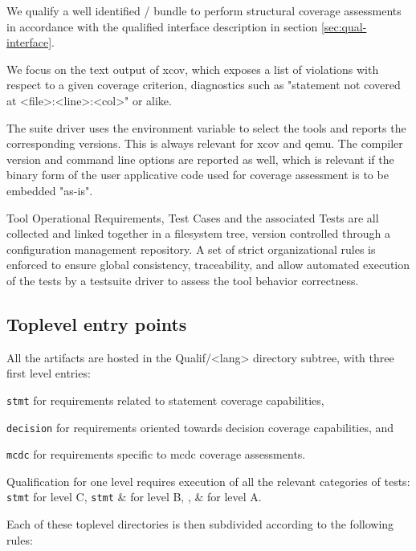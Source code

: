 \documentclass {report}
\begin{document}
We qualify a well identified \xcov{}/\qemu{} bundle to perform structural
coverage assessments in accordance with the qualified interface description in
section \ref{sec:qual-interface}.

We focus on the  text output of xcov, which exposes a
list of violations with respect to a given coverage criterion, diagnostics
such as "statement not covered at <file>:<line>:<col>" or alike.

The suite driver uses the  environment variable to select the tools
and reports the corresponding versions. This is always relevant for xcov and
qemu.
%
The compiler version and command line options are reported as well, which is
relevant if the binary form of the user applicative code used for coverage
assessment is to be embedded "as-is".

Tool Operational Requirements, Test Cases and the associated Tests are
all collected and linked together in a filesystem tree, version controlled
through a configuration management repository.
%
A set of strict organizational rules is enforced to ensure global consistency,
traceability, and allow automated execution of the tests by a testsuite driver
to assess the tool behavior correctness.

\subsection{Toplevel entry points}

All the artifacts are hosted in the Qualif/<lang> directory subtree, with
three first level entries:

\begin{Itemize}
\item \texttt{stmt} for requirements related to statement coverage
   capabilities,
%
\item \texttt{decision} for requirements oriented towards decision coverage
   capabilities, and
%
\item \texttt{mcdc} for requirements specific to mcdc coverage assessments.
\end{Itemize}

Qualification for one \do{} level requires execution of all the relevant
categories of tests: \texttt{stmt} for level C, \texttt{stmt} \& 
for level B, ,  \&  for level A.

Each of these toplevel directories is then subdivided according to
the following rules:
\end{document}
